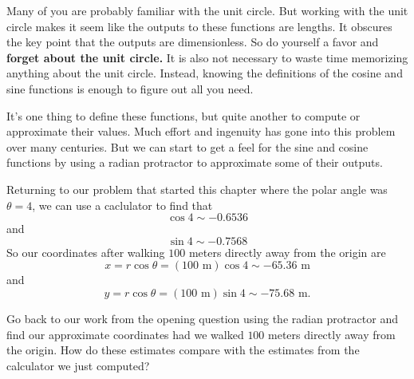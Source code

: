 \documentclass{ximera}
\begin{document}
Many of you are probably familiar with the unit circle. But working with the unit circle makes it seem like the outputs to these functions are lengths. It obscures the key point that the outputs are dimensionless. So do yourself a favor and {\bf forget about the unit circle.} It is also not necessary to waste time memorizing anything about the unit circle. Instead, knowing the definitions of the cosine and sine functions is enough to figure out all you need.

It's one thing to define these functions, but quite another to compute or approximate their values. Much effort and ingenuity has gone into this problem over many centuries. But we can start to get a feel for the sine and cosine functions by using a radian protractor to approximate some of their outputs.

Returning to our problem that started this chapter where the polar angle was $\theta=4$, we can use a caclulator to find that
\[
  \cos 4 \sim -0.6536
\]
and
\[
   \sin 4 \sim -0.7568
\]
So our coordinates after walking $100$ meters directly away from the origin are 
\[
     x = r\cos \theta = (100 \text{ m})\cos 4 \sim -65.36\text{ m}
\]
and
\[
     y = r\cos \theta = (100 \text{ m})\sin 4 \sim -75.68\text{ m} .
\]

\begin{question}  \label{QWEREWR:Cosine}
Go back to our work from the opening question using the radian protractor and find our approximate coordinates had we walked $100$ meters directly away from the origin. How do these estimates compare with the estimates from the calculator we just computed?
\end{question}
\end{document}
